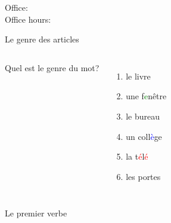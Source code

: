 \documentclass{beamer}
\subtitle[Présentons-nous et articles]{Présentons-nous et les articles}
\begin{document}
  \begin{frame}
    \titlepage
    \tiny{Office: \\
          Office hours: }
  \end{frame}

  \begin{frame}{Le genre des articles }
    \begin{columns}
        Quel est le genre du mot? \\
        \begin{enumerate}
          \item \underline{} le livre
          \item \underline{} une f\textcolor<8->{green}{e}nêtre
          \item \underline{\uncover<4->{masculin}} le bureau
          \item \underline{} un coll\textcolor<8->{blue}{è}ge
          \item \underline{} la t\textcolor<8->{red}{é}l\textcolor<8->{red}{é}
          \item \underline{} les portes
        \end{enumerate}
    \end{columns}
  \end{frame}

  \begin{frame}{Le premier verbe }
    \begin{center}
      
    \end{center}
  \end{frame}
\end{document}
